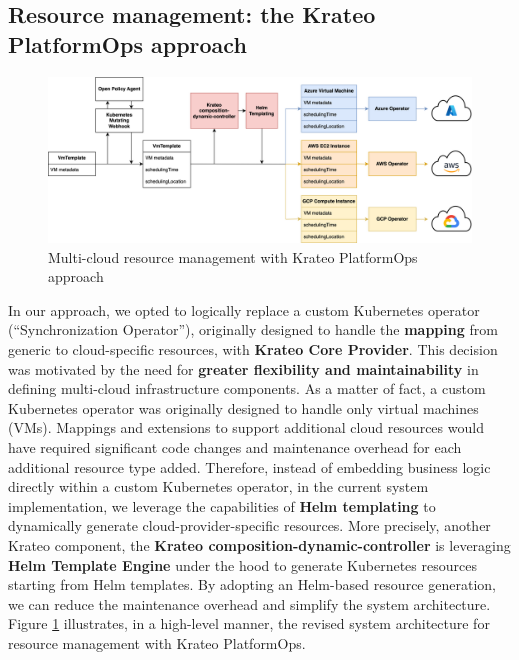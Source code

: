 \subsection{Resource management: the Krateo PlatformOps approach}

\begin{figure}[htb]
  \centering
  \includegraphics[width=1\linewidth]{images/krateo.png}
  \caption{Multi-cloud resource management with Krateo PlatformOps approach}
  \label{fig:krateo}
\end{figure}

In our approach, we opted to logically replace a custom Kubernetes operator (``Synchronization Operator''), originally designed to handle the \textbf{mapping} from generic to cloud-specific resources, with \textbf{Krateo Core Provider}. 
This decision was motivated by the need for \textbf{greater flexibility and maintainability} in defining multi-cloud infrastructure components. 
As a matter of fact, a custom Kubernetes operator was originally designed to handle only virtual machines (VMs).
Mappings and extensions to support additional cloud resources would have required significant code changes and maintenance overhead for each additional resource type added.
Therefore, instead of embedding business logic directly within a custom Kubernetes operator, in the current system implementation, we leverage the capabilities of \textbf{Helm templating} to dynamically generate cloud-provider-specific resources. 
More precisely, another Krateo component, the \textbf{Krateo composition-dynamic-controller} is leveraging \textbf{Helm Template Engine} under the hood to generate Kubernetes resources starting from Helm templates.
By adopting an Helm-based resource generation, we can reduce the maintenance overhead and simplify the system architecture.
Figure \ref{fig:krateo} illustrates, in a high-level manner, the revised system architecture for resource management with Krateo PlatformOps.

